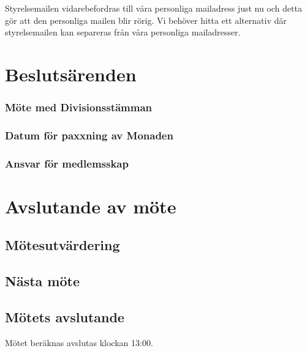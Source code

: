\documentclass[protokoll]{dvd}
\begin{document}
Styrelsemailen vidarebefordras till våra personliga mailadress just nu och detta gör att den personliga mailen blir rörig. Vi behöver hitta ett alternativ där styrelsemailen kan separeras från våra personliga mailadresser.










\newpage

\section{Beslutsärenden}


\subsubsection{Möte med Divisionsstämman}

\subsubsection{Datum för paxxning av Monaden}

\subsubsection{Ansvar för medlemsskap}



\section{Avslutande av möte}

\subsection{Mötesutvärdering}

\subsection{Nästa möte}

\subsection{Mötets avslutande}

Mötet beräknas avslutas klockan 13:00.

\styrelsesignaturer
\end{document}
